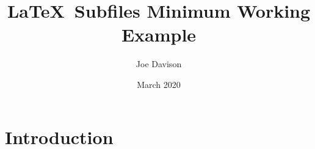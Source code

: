 \documentclass[11pt,twoside,a4paper]{report}
\title{
  \LaTeX~Subfiles Minimum Working Example
}
\author{Joe Davison}
\date{March 2020}
\def\biblio{}
\begin{document}
\def\biblio{}
  
\maketitle
\newpage

\setcounter{page}{1}

\chapter{Introduction} \label{chap:intro}


 \label{sec:references}
\end{document}
